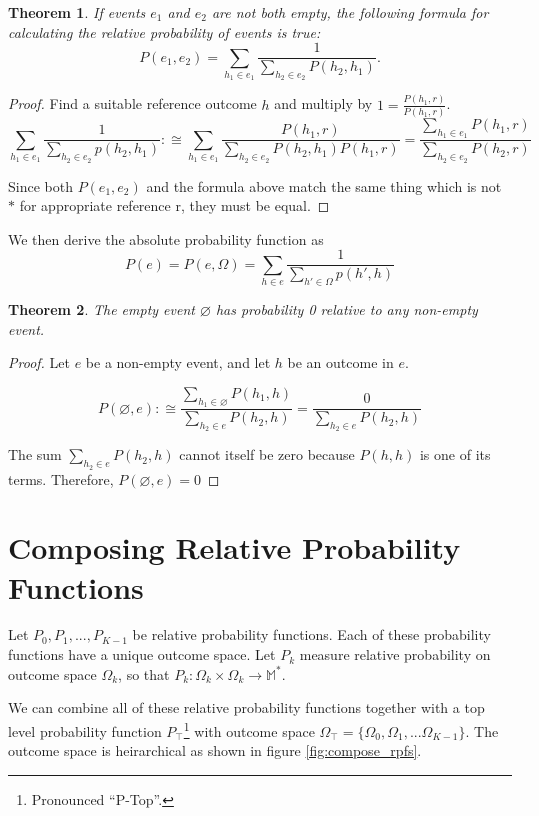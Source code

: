 \documentclass[twoside]{article}
\newcommand{\quotes}[1]{``#1''}
\theoremstyle{plain}%
\newtheorem{theorem}{Theorem}[section]
\theoremstyle{definition}
\theoremstyle{remark}
\begin{document}
\begin{theorem}
If events \(e_1\) and \(e_2\) are not both empty, the following formula for calculating the relative probability of events is true:
\[P(e_1, e_2) = \sum_{h_1 \in e_1} \frac{1}{\sum_{h_2 \in e_2} P(h_2, h_1)}.\]
\end{theorem}

\begin{proof}
Find a suitable reference outcome \(h\) and multiply by \(1 = \frac{P(h_1, r)}{P(h_1, r)}\).
\[\sum_{h_1 \in e_1} \frac{1}{\sum_{h_2 \in e_2} p(h_2, h_1)} :\cong \sum_{h_1 \in e_1} \frac{P(h_1, r)}{\sum_{h_2 \in e_2} P(h_2, h_1) P(h_1, r)} = \frac{\sum_{h_1 \in e_1} P(h_1, r)}{\sum_{h_2 \in e_2} P(h_2, r)}\]

Since both \(P(e_1, e_2)\) and the formula above match the same thing which is not \(\ast\) for appropriate reference r, they must be equal.
\end{proof}

We then derive the absolute probability function as
\[P(e) = P(e, \Omega) = \sum_{h \in e} \frac{1}{\sum_{h' \in \Omega}p(h', h)}\]

\begin{theorem}
\label{thm:empty_event_impossible}
The empty event \(\varnothing\) has probability 0 relative to any non-empty event.
\end{theorem}

\begin{proof}
Let \(e\) be a non-empty event, and let \(h\) be an outcome in \(e\).

\[P(\varnothing, e) :\cong \frac{\sum_{h_1 \in \varnothing} P(h_1, h)}{\sum_{h_2 \in e} P(h_2, h)} = \frac{0}{\sum_{h_2 \in e} P(h_2, h)}\]

The sum \(\sum_{h_2 \in e} P(h_2, h)\) cannot itself be zero because \(P(h, h)\) is one of its terms. Therefore, \(P(\varnothing, e) = 0\)
\end{proof}

\section{Composing Relative Probability Functions}

Let \(P_0, P_1, ..., P_{K-1}\) be relative probability functions. Each of these probability functions have a unique outcome space. Let \(P_k\) measure relative probability on outcome space \(\Omega_k\), so that \(P_k: \Omega_k \times \Omega_k \rightarrow \mathbb{M}^{\ast}\).

We can combine all of these relative probability functions together with a top level probability function \(P_\top\)\footnote{Pronounced \quotes{P-Top}.} with outcome space \(\Omega_\top = \{\Omega_0, \Omega_1, ... \Omega_{K- 1}\}\). The outcome space is heirarchical as shown in figure \ref{fig:compose_rpfs}.
\end{document}
